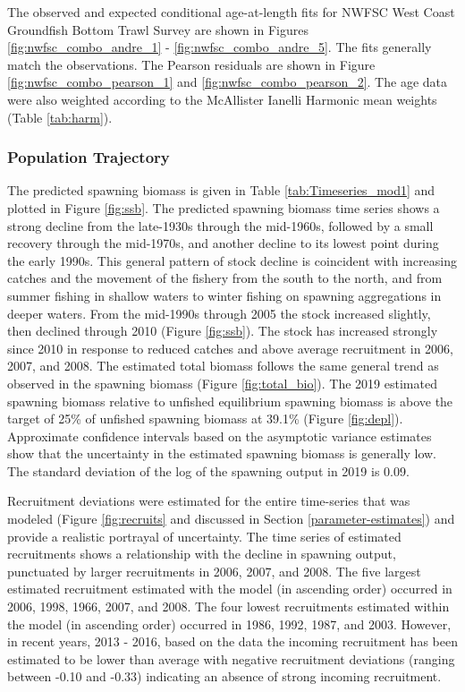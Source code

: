 \documentclass[12pt,]{article}
\begin{document}
The observed and expected conditional age-at-length fits for NWFSC West
Coast Groundfish Bottom Trawl Survey are shown in Figures
\ref{fig:nwfsc_combo_andre_1} - \ref{fig:nwfsc_combo_andre_5}. The fits
generally match the observations. The Pearson residuals are shown in
Figure \ref{fig:nwfsc_combo_pearson_1} and
\ref{fig:nwfsc_combo_pearson_2}. The age data were also weighted
according to the McAllister Ianelli Harmonic mean weights (Table
\ref{tab:harm}).

\subsubsection{Population Trajectory}\label{population-trajectory}

The predicted spawning biomass is given in Table
\ref{tab:Timeseries_mod1} and plotted in Figure \ref{fig:ssb}. The
predicted spawning biomass time series shows a strong decline from the
late-1930s through the mid-1960s, followed by a small recovery through
the mid-1970s, and another decline to its lowest point during the early
1990s. This general pattern of stock decline is coincident with
increasing catches and the movement of the fishery from the south to the
north, and from summer fishing in shallow waters to winter fishing on
spawning aggregations in deeper waters. From the mid-1990s through 2005
the stock increased slightly, then declined through 2010 (Figure
\ref{fig:ssb}). The stock has increased strongly since 2010 in response
to reduced catches and above average recruitment in 2006, 2007, and
2008. The estimated total biomass follows the same general trend as
observed in the spawning biomass (Figure \ref{fig:total_bio}). The 2019
estimated spawning biomass relative to unfished equilibrium spawning
biomass is above the target of 25\% of unfished spawning biomass at
39.1\% (Figure \ref{fig:depl}). Approximate confidence intervals based
on the asymptotic variance estimates show that the uncertainty in the
estimated spawning biomass is generally low. The standard deviation of
the log of the spawning output in 2019 is 0.09.

Recruitment deviations were estimated for the entire time-series that
was modeled (Figure \ref{fig:recruits} and discussed in Section
\ref{parameter-estimates}) and provide a realistic portrayal of
uncertainty. The time series of estimated recruitments shows a
relationship with the decline in spawning output, punctuated by larger
recruitments in 2006, 2007, and 2008. The five largest estimated
recruitment estimated with the model (in ascending order) occurred in
2006, 1998, 1966, 2007, and 2008. The four lowest recruitments estimated
within the model (in ascending order) occurred in 1986, 1992, 1987, and
2003. However, in recent years, 2013 - 2016, based on the data the
incoming recruitment has been estimated to be lower than average with
negative recruitment deviations (ranging between -0.10 and -0.33)
indicating an absence of strong incoming recruitment.
\end{document}
